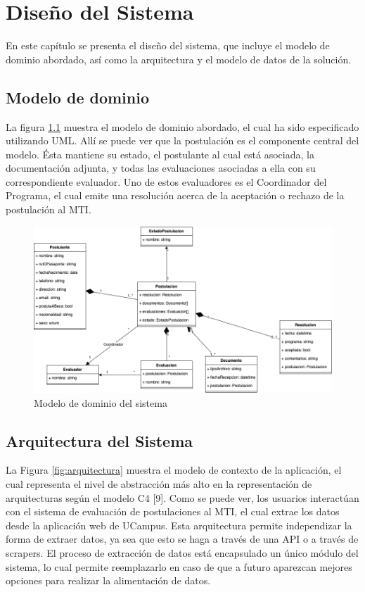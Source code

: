 \chapter{Diseño del Sistema}

En este capítulo se presenta el diseño del sistema, que incluye el modelo de
dominio abordado, así como la arquitectura y el modelo de datos de la solución.

\section{Modelo de dominio}

La figura \ref{fig:modelo-dominio} muestra el modelo de dominio abordado, el cual ha
sido especificado utilizando UML. Allí se puede ver que la postulación es el
componente central del modelo. Ésta mantiene su estado, el postulante al cual
está asociada, la documentación adjunta, y todas las evaluaciones asociadas a
ella con su correspondiente evaluador. Uno de estos evaluadores es el
Coordinador del Programa, el cual emite una resolución acerca de la aceptación o
rechazo de la postulación al MTI.

\begin{figure}[!ht]
    \begin{center}
        \includegraphics[scale=0.4]{imagenes/03-modelo-dominio.png}
    \end{center}
    \caption{Modelo de dominio del sistema}
    \label{fig:modelo-dominio}
\end{figure}

\section{Arquitectura del Sistema}

La Figura \ref{fig:arquitectura} muestra el modelo de contexto de la aplicación,
el cual representa el nivel de abstracción más alto en la representación de
arquitecturas según el modelo C4 [9]. Como se puede ver, los usuarios
interactúan con el sistema de evaluación de postulaciones al MTI, el cual extrae
los datos desde la aplicación web de UCampus. Esta arquitectura permite
independizar la forma de extraer datos, ya sea que esto se haga a través de una
API o a través de scrapers. El proceso de extracción de datos está encapsulado
un único módulo del sistema, lo cual permite reemplazarlo en caso de que a
futuro aparezcan mejores opciones para realizar la alimentación de datos.

